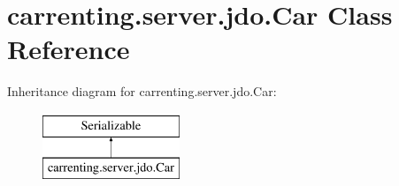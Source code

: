 \hypertarget{classcarrenting_1_1server_1_1jdo_1_1_car}{}\section{carrenting.\+server.\+jdo.\+Car Class Reference}
\label{classcarrenting_1_1server_1_1jdo_1_1_car}
Inheritance diagram for carrenting.\+server.\+jdo.\+Car\+:\begin{figure}[H]
\begin{center}
\leavevmode
\includegraphics[height=2.000000cm]{classcarrenting_1_1server_1_1jdo_1_1_car}
\end{center}
\end{figure}
